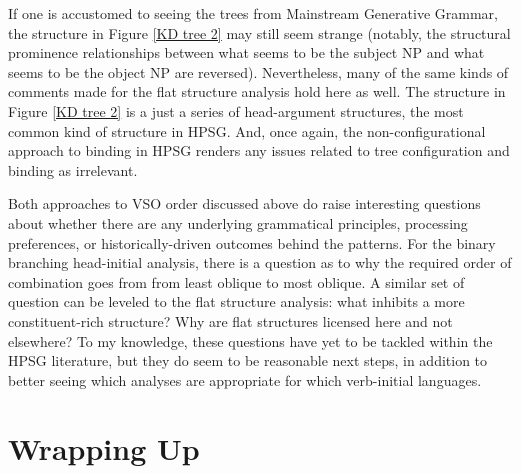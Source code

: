 \documentclass[output=paper
                ,modfonts
                ,nonflat
	        ,collection
	        ,collectionchapter
	        ,collectiontoclongg
 	        ,biblatex
                ,babelshorthands
                ,newtxmath
                ,draftmode
                ,colorlinks, citecolor=brown
]{./langsci/langscibook}
\begin{document}
{If one is accustomed to seeing the trees from Mainstream Generative Grammar, the structure in Figure \ref{KD tree 2} may still seem strange (notably, the structural prominence relationships between what seems to be the subject NP and what seems to be the object NP are reversed). Nevertheless, many of the same kinds of comments made for the flat structure analysis hold here as well. The structure in Figure \ref{KD tree 2} is a just a series of head-argument structures, the most common kind of structure in HPSG. And, once again, the non-configurational approach to binding in HPSG renders any issues related to tree configuration and binding as irrelevant.    

Both approaches to VSO order discussed above do raise interesting questions about whether there are any underlying grammatical principles, processing preferences, or historically-driven outcomes behind the patterns. For the binary branching head-initial analysis, there is a question as to why the required order of combination goes from from least oblique to most oblique. A similar set of question can be leveled to the flat structure analysis: what inhibits a more constituent-rich structure? Why are flat structures licensed here and not elsewhere? To my knowledge, these questions have yet to be tackled within the HPSG literature, but they do seem to be reasonable next steps, in addition to better seeing which analyses are appropriate for which verb-initial languages. 
	
\section{Wrapping Up}

}
\end{document}
